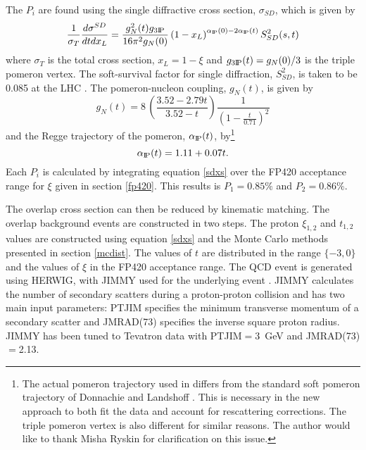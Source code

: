 The $P_i$ are found using the single diffractive cross section, $\sigma_{SD}$, which is given \cite{Khoze:2006gg} by
\begin{equation} \label{sdxs}
\frac{1}{\sigma_T}\frac{d\sigma^{SD}}{dtdx_L} = \frac{g_N^2(t) g_{3\text{I$\!$P}}}{16\pi^2 g_N(0)}
\left(1 - x_L \right)^{\alpha_{\text{I$\!$P}}(0) - 2 \alpha_{\text{I$\!$P}}(t)} S_{SD}^2(s,t)
\end{equation}
where $\sigma_{T}$ is the total cross section, $x_L=1-\xi$ and $g_{3\text{I$\!$P}}(t) = g_N(0)/3$ is the triple pomeron vertex. 
The soft-survival factor for single diffraction, $S_{SD}^2$, is taken to be 0.085 at the LHC \cite{Khoze:2006gg}. 
The pomeron-nucleon coupling, $g_N(t)$, is given by 
\begin{equation}
g_N(t) = 8 \, \left( \frac{3.52 - 2.79t}{3.52 -t} \right) \frac{1}{\left(1 - \frac{t}{0.71}\right)^2}
\end{equation}
and the Regge trajectory of the pomeron, $\alpha_{\text{I$\!$P}}(t)$, by\footnote{The actual pomeron trajectory used in \cite{Khoze:2006gg} differs from the standard soft pomeron trajectory of Donnachie and Landshoff \cite{Donnachie:1992ny}. This is necessary in the new approach to both fit the data and account for rescattering corrections. The triple pomeron vertex is also different for similar reasons. The author would like to thank Misha Ryskin for clarification on this issue.}
\begin{equation}
\alpha_{\text{I$\!$P}}(t) = 1.11 + 0.07t.
\end{equation}
Each $P_i$ is calculated by integrating equation \ref{sdxs} over the FP420 acceptance range for $\xi$ given in section \ref{fp420}. This results is $P_1 = 0.85\%$ and $P_2=0.86\%$. 

The overlap cross section can then be reduced by kinematic matching. The overlap background events are constructed in two steps. The proton $\xi_{1,2}$ and $t_{1,2}$ values are constructed using equation \ref{sdxs} and the Monte Carlo methods presented in section \ref{mcdist}. The values of $t$ are distributed in the range $\{-3,0\}$ and the values of $\xi$ in the FP420 acceptance range.
The QCD event is generated using HERWIG, with JIMMY used for the underlying event  \cite{Butterworth:1996zw}. JIMMY calculates the number of secondary scatters during a proton-proton collision and has two main input parameters: PTJIM specifies the minimum transverse momentum of a secondary scatter and JMRAD(73) specifies the inverse square proton radius. JIMMY has been tuned to Tevatron data \cite{Alekhin:2005dx:MPITune} with PTJIM$=$3~GeV and JMRAD(73)$=$2.13. 

